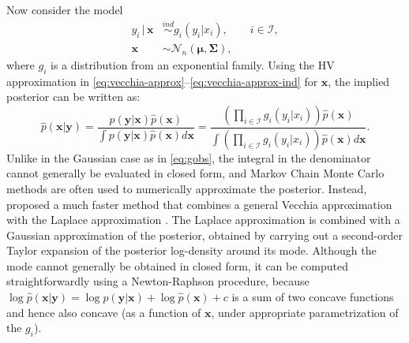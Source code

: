 \documentclass[12pt,letterpaper]{article}
\theoremstyle{propstyle}
\theoremstyle{propstyle}
\theoremstyle{propstyle}
\theoremstyle{propstyle}
\theoremstyle{propstyle}
\newcommand{\bx}{\mathbf{x}}
\newcommand{\by}{\mathbf{y}}
\newcommand{\bfmu}{\bm{\mu}}
\newcommand{\bfSigma}{\bm{\Sigma}}
\newcommand{\normal}{\mathcal{N}}
\newcommand{\obs}{\mathcal{I}}
\begin{document}
Now consider the model
\begin{align}
\label{eq:ngobs} y_{i} \,|\, \bx & \stackrel{ind}{\sim} g_i(y_{i} | x_{i}),\qquad i \in \obs, \\
\label{eq:ngevol} \bx  & \sim \normal_n(\bfmu,\bfSigma),
\end{align}
where $g_i$ is a distribution from an exponential family. Using the HV approximation in \eqref{eq:vecchia-approx}--\eqref{eq:vecchia-approx-ind} for $\bx$, the implied posterior can be written as:
\begin{equation}
    \label{eq:nongaussianpost}
\hat{p}(\bx|\by) = \frac{p(\by|\bx) \hat{p}(\bx)}{\int p(\by|\bx) \hat{p}(\bx) d\bx} = \frac{(\prod_{i \in \obs} g_i(y_i|x_i)) \hat{p}(\bx)}{\int (\prod_{i \in \obs} g_i(y_i|x_i)) \hat{p}(\bx) d\bx}.
\end{equation}
Unlike in the Gaussian case as in \eqref{eq:gobs}, the integral in the denominator cannot generally be evaluated in closed form, and Markov Chain Monte Carlo methods are often used to numerically approximate the posterior. Instead, \citet{Zilber2019} proposed a much faster method that combines a general Vecchia approximation with the Laplace approximation \citep[e.g.][Sect.~3.4]{Tierney1986,Rasmussen2006}. The Laplace approximation is combined with a Gaussian approximation of the posterior, obtained by carrying out a second-order Taylor expansion of the posterior log-density around its mode. Although the mode cannot generally be obtained in closed form, it can be computed straightforwardly using a Newton-Raphson procedure, because $\log \hat{p}(\bx|\by) = \log p(\by|\bx) + \log \hat{p}(\bx) + c$ is a sum of two concave functions and hence also concave (as a function of $\bx$, under appropriate parametrization of the $g_i$).
\end{document}
